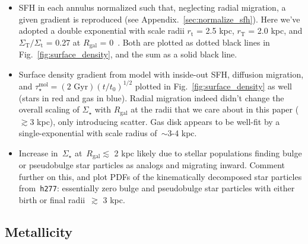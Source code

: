 \documentclass[a4paper, fleqn, usenatbib, useAMS]{mnras}
\begin{document}
\begin{itemize} 
	\item SFH in each annulus normalized such that, neglecting radial 
	migration, a given gradient is reproduced (see 
	Appendix.~\ref{sec:normalize_sfh}). Here we've adopted a double 
	exponential with scale radii $r_\text{t}$ = 2.5 kpc, $r_\text{T}$ = 2.0 
	kpc, and $\Sigma_\text{T}/\Sigma_\text{t}$ = 0.27 at $R_\text{gal}$ = 
	0~\citep{Bland-Hawthorn2016}. Both are plotted as dotted black lines in 
	Fig.~\ref{fig:surface_density}, and the sum as a solid black line. 

	\item Surface density gradient from model with inside-out SFH, diffusion 
	migration, and $\tau_\star^\text{mol} = (\text{2 Gyr})(t/t_0)^{1/2}$ 
	plotted in Fig.~\ref{fig:surface_density} as well (stars in red and gas 
	in blue). Radial migration indeed didn't change the overall scaling of 
	$\Sigma_\star$ with $R_\text{gal}$ at the radii that we care about in 
	this paper ($\gtrsim$3 kpc), only introducing scatter. Gas disk appears to 
	be well-fit by a single-exponential with scale radius of~$\sim$3-4 kpc. 

	\item Increase in~$\Sigma_\star$ at~$R_\text{gal} \lesssim$ 2 kpc likely 
	due to stellar populations finding bulge or pseudobulge star particles as 
	analogs and migrating inward. {\color{red} Comment further on this, and 
	plot PDFs of the kinematically decomposed star particles 
	from~\texttt{h277}: essentially zero bulge and pseudobulge star particles 
	with either birth or final radii~$\gtrsim$ 3 kpc.} 
\end{itemize} 

\subsection{Metallicity} 
\label{sec:gradients:metallicity} 
\end{document}
